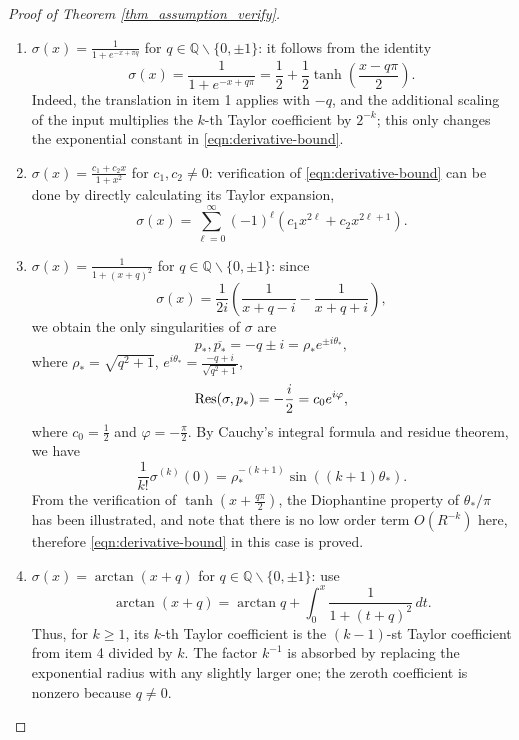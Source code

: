 \documentclass{article}
\numberwithin{equation}{section}
\def\QQ{\mathbb{Q}}
\def\lt{\left}
\def\rt{\right}
\begin{document}
\begin{proof}[Proof of Theorem \ref{thm_assumption_verify}]
\begin{enumerate}
        Next, define polynomials \(P_k\in\mathbb{Z}[z]\) by
        \[
        P_0(z)=z,\qquad
        P_{k+1}(z)=(1-z^2)P_k'(z).
        \]
        An induction gives
        \[
        \frac{d^k}{dx^k}\tanh x=P_k(\tanh x).
        \]
        Moreover, each \(P_k\) is a nonzero polynomial; in fact,
        \[
        \deg P_k=k+1
        \]
        and its leading coefficient is \((-1)^k k!\).
        Since \(P_k\) is a nonzero polynomial with integer coefficients and \(\tanh(q\pi/2)\) is transcendental, we have
        \[
        \sigma^{(k)}(0) = P_k(\tanh(\frac{q\pi}{2}))\neq 0.
        \]
        The verification of \eqref{eqn:derivative-bound} for $\sigma(x)$ is then completed.
    \item $\displaystyle\sigma(x) = \frac{1}{1+e^{-x+\pi q}}$ for $q\in\QQ\backslash\{0,\pm 1\}$: it follows from the identity 
    $$
    \sigma(x) = \frac{1}{1+e^{-x+ q\pi}} = \frac{1}{2}+ \frac{1}{2}\tanh\lt(\frac{x-q\pi}{2}\rt).
    $$
    Indeed, the translation in item 1 applies with $-q$, and the additional scaling of the input multiplies the $k$-th Taylor coefficient by $2^{-k}$; this only changes the exponential constant in \eqref{eqn:derivative-bound}.
    \item $\displaystyle\sigma(x) = \frac{c_1 + c_2 x}{1+x^2}$ for $c_1,c_2\neq 0$: verification of \eqref{eqn:derivative-bound} can be done by directly calculating its Taylor expansion,
        $$ 
        \sigma(x) = \sum_{\ell=0}^\infty (-1)^\ell (c_1 x^{2\ell} + c_2 x^{2\ell+1}).
        $$
    \item $\displaystyle\sigma(x) = \frac{1}{1+(x+q)^2}$ for $q\in\QQ\backslash\{0,\pm 1\}$: since 
        $$
        \sigma(x) = \frac{1}{2i}\lt( \frac{1}{x+q-i}-\frac{1}{x+q+i} \rt),
        $$
        we obtain the only singularities of $\sigma$ are $$p_\ast, \overline{p_\ast} = -q \pm i = \rho_\ast e^{\pm i\theta_\ast},$$
        where $\rho_\ast = \sqrt{q^2 + 1}$, $e^{i\theta_\ast} = \displaystyle\frac{-q + i}{\sqrt{q^2 + 1}}$,
        $${\rm Res}(\sigma,p_\ast) = -\frac{i}{2} = c_0 e^{i\varphi},$$
        where $c_0 = \frac{1}{2}$ and $\varphi = -\frac{\pi}{2}$. 
        By Cauchy's integral formula and residue theorem, we have
        $$\frac{1}{k!}\sigma^{(k)}(0) = \rho_\ast^{-(k+1)}\sin((k+1)\theta_\ast).$$
        From the verification of $\tanh(x+\frac{q\pi}{2})$, the Diophantine property of $\theta_\ast/\pi$ has been illustrated, and note that there is no low order term $O(R^{-k})$ here, therefore \eqref{eqn:derivative-bound} in this case is proved. 
    \item $\displaystyle\sigma(x) = \arctan(x+q)$ for $q\in\QQ\backslash\{0,\pm 1\}$: use
    $$ \arctan(x+q) = \arctan q + \int_0^x \frac{1}{1+(t+q)^2}\,dt.$$
    Thus, for $k\geq1$, its $k$-th Taylor coefficient is the $(k-1)$-st Taylor coefficient from item 4 divided by $k$. The factor $k^{-1}$ is absorbed by replacing the exponential radius with any slightly larger one; the zeroth coefficient is nonzero because $q\neq0$.
    \end{enumerate}
    \end{proof}
\end{document}
